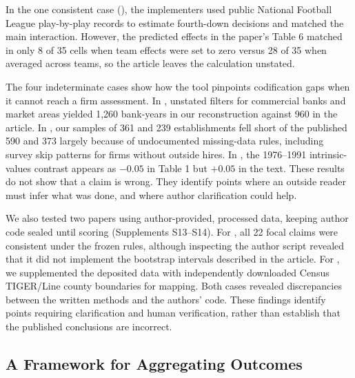 \documentclass[12pt]{article}
\begin{document}
In the one consistent case (\citealp{lehman2011}), the implementers used public National Football League play-by-play records to estimate fourth-down decisions and matched the main interaction. However, the predicted effects in the paper's Table 6 matched in only 8 of 35 cells when team effects were set to zero versus 28 of 35 when averaged across teams, so the article leaves the calculation unstated.

The four indeterminate cases show how the tool pinpoints codification gaps when it cannot reach a firm assessment. In \citet{deephouse1999}, unstated filters for commercial banks and market areas yielded 1,260 bank-years in our reconstruction against 960 in the article. In \citet{delaney1996}, our samples of 361 and 239 establishments fell short of the published 590 and 373 largely because of undocumented missing-data rules, including survey skip patterns for firms without outside hires. In \citet{twenge2010}, the 1976--1991 intrinsic-values contrast appears as $-0.05$ in Table 1 but $+0.05$ in the text. These results do not show that a claim is wrong. They identify points where an outside reader must infer what was done, and where author clarification could help.

We also tested two papers using author-provided, processed data, keeping author code sealed until scoring (Supplements S13--S14). For \citet{berry2025}, all 22 focal claims were consistent under the frozen rules, although inspecting the author script revealed that it did not implement the bootstrap intervals described in the article. For \citet{nagaraj2021}, we supplemented the deposited data with independently downloaded Census TIGER/Line county boundaries for mapping. Both cases revealed discrepancies between the written methods and the authors' code. These findings identify points requiring clarification and human verification, rather than establish that the published conclusions are incorrect.

\subsection{A Framework for Aggregating Outcomes}
\end{document}
